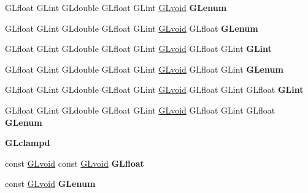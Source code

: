 \begin{DoxyCompactItemize}
G\+Lfloat G\+Lint G\+Ldouble G\+Lfloat G\+Lint \hyperlink{interfacevoid}{G\+Lvoid} {\bfseries G\+Lenum}
\item 
\mbox{\label{struct_____g_ldispatch_table_rec_a19d746d02a9712d9fae7a9a3d904f235}} 
G\+Lfloat G\+Lint G\+Ldouble G\+Lfloat G\+Lint \hyperlink{interfacevoid}{G\+Lvoid} G\+Lfloat {\bfseries G\+Lenum}
\item 
\mbox{\label{struct_____g_ldispatch_table_rec_afca31c94940e0512c1543c66b4261f64}} 
G\+Lfloat G\+Lint G\+Ldouble G\+Lfloat G\+Lint \hyperlink{interfacevoid}{G\+Lvoid} G\+Lfloat G\+Lint {\bfseries G\+Lint}
\item 
\mbox{\label{struct_____g_ldispatch_table_rec_a18f5b5552d972fc2756b6926f4c28543}} 
G\+Lfloat G\+Lint G\+Ldouble G\+Lfloat G\+Lint \hyperlink{interfacevoid}{G\+Lvoid} G\+Lfloat G\+Lint {\bfseries G\+Lenum}
\item 
\mbox{\label{struct_____g_ldispatch_table_rec_ae4cfd899fd87d9b23ce74957843f2d97}} 
G\+Lfloat G\+Lint G\+Ldouble G\+Lfloat G\+Lint \hyperlink{interfacevoid}{G\+Lvoid} G\+Lfloat G\+Lint G\+Lfloat {\bfseries G\+Lint}
\item 
\mbox{\label{struct_____g_ldispatch_table_rec_a48a1c700395e88aec112f2824a801098}} 
G\+Lfloat G\+Lint G\+Ldouble G\+Lfloat G\+Lint \hyperlink{interfacevoid}{G\+Lvoid} G\+Lfloat G\+Lint G\+Lfloat {\bfseries G\+Lenum}
\item 
\mbox{\label{struct_____g_ldispatch_table_rec_ab32319fd84e9a87613754a87a1d5fd37}} 
{\bfseries G\+Lclampd}
\item 
\mbox{\label{struct_____g_ldispatch_table_rec_ac8b103165dce02043fe12f387e11d152}} 
const \hyperlink{interfacevoid}{G\+Lvoid} const \hyperlink{interfacevoid}{G\+Lvoid} {\bfseries G\+Lfloat}
\item 
\mbox{\label{struct_____g_ldispatch_table_rec_afe80640fd8e934c5b46ab8d4d0baecdc}} 
const \hyperlink{interfacevoid}{G\+Lvoid} {\bfseries G\+Lenum}
\item 

\end{DoxyCompactItemize}
